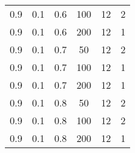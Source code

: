 \begin{table}[h]
\begin{center}
\begin{tabular}{|c|c|c|c|c|c|}
	0.9 &  0.1 &  0.6 &  100 &    12 &     2 \\
	0.9 &  0.1 &  0.6 &  200 &    12 &     1 \\
   \hline
	0.9 &  0.1 &  0.7 &   50 &    12 &     2 \\
	0.9 &  0.1 &  0.7 &  100 &    12 &     1 \\
	0.9 &  0.1 &  0.7 &  200 &    12 &     1 \\
   \hline
	0.9 &  0.1 &  0.8 &   50 &    12 &     2 \\
	0.9 &  0.1 &  0.8 &  100 &    12 &     2 \\
	0.9 &  0.1 &  0.8 &  200 &    12 &     1 \\
   \hline
		\end{tabular}
	\end{center}
\end{table}

